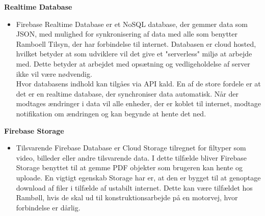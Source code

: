 \textbf{Realtime Database\cite{FirebaseRealtimeDB}}
\begin{itemize}[-]
	\itemsep 0.3em 
	\item[]  Firebase Realtime Database er et NoSQL database, der gemmer data som JSON\cite{JSON}, med mulighed for synkronisering af data med alle som benytter Ramboell Tilsyn, der har forbindelse til internet. Databasen er cloud hosted, hvilket betyder at som udviklere vil det give et "serverless" miljø at arbejde med. Dette betyder at arbejdet med opsætning og vedligeholdelse af server ikke vil være nødvendig. \\ 
	Hvor databasens indhold kan tilgåes via API kald. 
	En af de store fordele er at det er en realtime database, der synchroniser data automatisk. Når der modtages ændringer i data vil alle enheder, der er koblet til internet, modtage notifikation om ændringen og kan begynde at hente det ned. 
\end{itemize}

\textbf{Firebase Storage\cite{FirebaseStorage}}
\begin{itemize}[-]
	\itemsep 0.3em 
	\item[] Tilsvarende Firebase Database er Cloud Storage tilregnet for filtyper som video, billeder eller andre tilsvarende data. I dette tilfælde bliver Firebase Storage benyttet til at gemme PDF objekter som brugeren kan hente og uploade. En vigtigt egenskab Storage har er, at den er bygget til at genoptage download af filer i tilfælde af ustabilt internet. Dette kan være tilfældet hos Rambøll, hvis de skal ud til konstruktionsarbejde på en motorvej, hvor forbindelse er dårlig. \\
\end{itemize}
\clearpage

